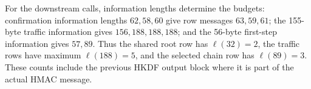 For the downstream calls, information lengths determine the budgets: confirmation
information lengths $62,58,60$ give row messages $63,59,61$; the
155-byte traffic information gives $156,188,188,188$; and the
56-byte first-step information gives $57,89$. Thus the shared root row
has $\ell(32)=2$, the traffic rows have maximum $\ell(188)=5$, and the
selected chain row has $\ell(89)=3$. These counts include the previous
HKDF output block where it is part of the actual HMAC message.
